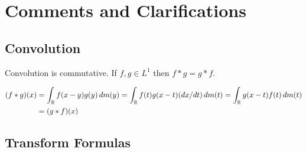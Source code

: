 
\section{Comments and Clarifications}

\subsection{Convolution} 

\begin{llem} \label{lem:conv:commut}
Convolution is commutative. If \(f,g\in L^1\) then
\(f\ast g = g\ast f\).
\end{llem}
\begin{thmproof}
\begin{align*}
(f\ast g)(x)
&= \int_{\mathbb{R}} f(x-y)g(y)\,dm(y)
 = \int_{\mathbb{R}} f(t)g(x-t)(dx/dt)\,dm(t)
 = \int_{\mathbb{R}} g(x-t)f(t)\,dm(t) \\
&= (g \ast f)(x)
\end{align*}
\end{thmproof}


\subsection{Transform Formulas} \label{subsec:xform:formulas}


